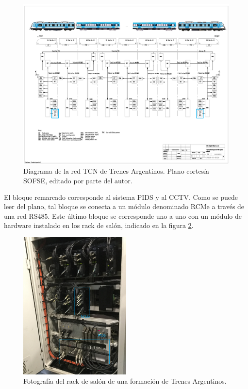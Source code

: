 \begin{figure}[h!]
	\includegraphics[width=1.4\textwidth, angle=90]{./Figures/diagramaTrenesArgentinosTCN.png}
	\caption{Diagrama de la red TCN de Trenes Argentinos. Plano cortesía SOFSE, editado por parte del autor.}
	\label{fig:sofseTCN}
\end{figure}

El bloque remarcado corresponde al sistema PIDS y al CCTV. Como se puede leer del plano, tal bloque se conecta a un módulo denominado RCMe a través de una red RS485. Este último bloque se corresponde uno a uno con un módulo de hardware instalado en los rack de salón, indicado en la figura \ref{fig:imgRackTCN}. \\

\begin{figure}[ht]
	\centering
	\includegraphics[width=0.5\textwidth , angle=0]{./Figures/imgRackTCN.JPG}
	\caption{Fotografía del rack de salón de una formación de Trenes Argentinos.}
	\label{fig:imgRackTCN}
\end{figure}

